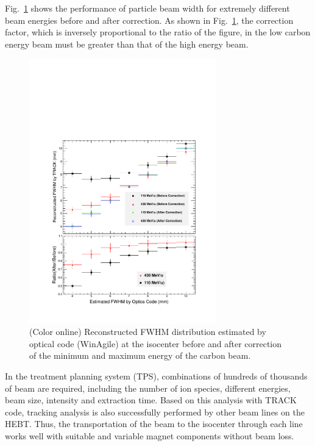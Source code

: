 \documentclass[jkps,preprint,fleqn,showpacs,showkeys]{revtex4}
\begin{document}
Fig.~\ref{fig8} shows the performance of particle beam width for extremely different beam energies before and after correction.
As shown in Fig.~\ref{fig8}, the correction factor, which is inversely proportional to the ratio of the figure, in the low carbon energy beam
must be greater than that of the high energy beam.
\begin{figure}[h]
  \begin{center}
    \includegraphics[width=8.1cm]{Fig07-1.pdf}
    \caption{(Color online) Reconstructed FWHM distribution estimated by optical code (WinAgile) at the isocenter before and after correction    
      of the minimum and maximum energy of the carbon beam.}
    \label{fig8}
  \end{center}
\end{figure}
In the treatment planning system (TPS), combinations of hundreds of thousands of beam are required,
including the number of ion species, different energies, beam size, intensity and extraction time.
Based on this analysis with TRACK code, tracking analysis is also successfully performed by other beam lines on the HEBT.
Thus, the transportation of the beam to the isocenter through each line works well with suitable and variable magnet components without beam loss.
\end{document}
